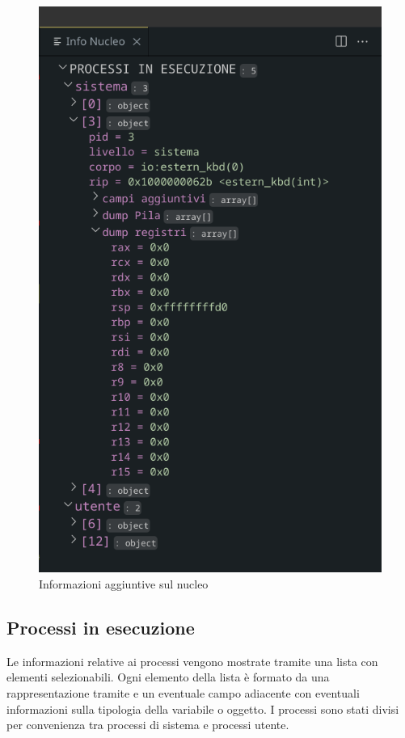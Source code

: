 \begin{figure}[H]
    \centering
    \includegraphics[height=0.3\pdfpageheight]{images/infoNucleo.png}
    \caption{Informazioni aggiuntive sul nucleo}
    \label{fig:infoNucleo}
\end{figure}

\subsection*{Processi in esecuzione}
Le informazioni relative ai processi vengono mostrate tramite una lista con elementi selezionabili. Ogni elemento della lista è formato da una rappresentazione tramite  e un eventuale campo adiacente con eventuali informazioni sulla tipologia della variabile o oggetto. I processi sono stati divisi per convenienza tra processi di sistema e processi utente. 



